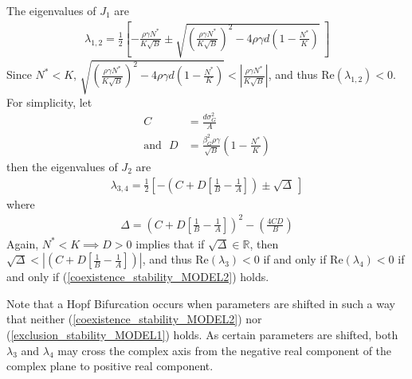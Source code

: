 \documentclass{amsart}
\theoremstyle{definition}
\theoremstyle{remark}
\numberwithin{equation}{section}
\begin{document}
The eigenvalues of $J_1$ are
\begin{align*}
	\lambda_{1,2} = \frac{1}{2}\left[-\frac{\rho\gamma N^*}{K\sqrt{B}} \pm \sqrt{\left(\frac{\rho\gamma N^*}{K\sqrt{B}}\right)^2 - 4\rho\gamma d\left(1 - \frac{N^*}{K}\right)}\ \right]
\end{align*}
Since $N^* < K$, $\sqrt{\left(\frac{\rho\gamma N^*}{K\sqrt{B}}\right)^2 - 4\rho\gamma d\left(1 - \frac{N^*}{K}\right)} < \left|\frac{\rho\gamma N^*}{K\sqrt{B}}\right|$, and thus $\text{Re}(\lambda_{1,2}) < 0$. \\

\noindent For simplicity, let
\begin{align*}
	C &= \frac{d\sigma_G^2}{A} \\
	\text{and} \ \ \ D &= \frac{\beta_G^2\rho\gamma}{\sqrt{B}}\left(1 - \frac{N^*}{K}\right)
\end{align*}
then the eigenvalues of $J_2$ are
\begin{align*}
	\lambda_{3,4} = \frac{1}{2}\left[-\left(C + D\left[\frac{1}{B} - \frac{1}{A} \right]\right) \pm \sqrt{\Delta}\ \right]
\end{align*}
where
\begin{align*}
	\Delta = \left(C + D\left[\frac{1}{B} - \frac{1}{A} \right]\right)^2 - \left(\frac{4CD}{B}\right)
\end{align*}
Again, $N^* < K \implies D > 0$ implies that if $\sqrt{\Delta} \in \mathbb{R}$, then $\sqrt{\Delta} < \left|\left(C + D\left[\frac{1}{B} - \frac{1}{A} \right]\right)\right|$, and thus $\text{Re}(\lambda_3) < 0$ if and only if $\text{Re}(\lambda_4) < 0$ if and only if (\ref{coexistence_stability_MODEL2}) holds.

Note that a Hopf Bifurcation occurs when parameters are shifted in such a way that neither (\ref{coexistence_stability_MODEL2}) nor (\ref{exclusion_stability_MODEL1}) holds.  As certain parameters are shifted, both $\lambda_3$ and $\lambda_4$ may cross the complex axis from the negative real component of the complex plane to positive real component.
\end{document}

